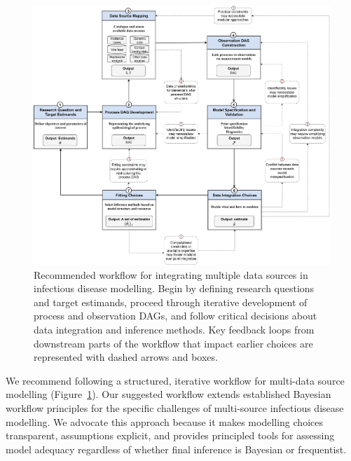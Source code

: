 \documentclass{article}
\begin{document}
\begin{figure}[htbp]
    \centering
    \includegraphics[width=\textwidth]{figures/core steps with more details.drawio.png}
    \caption{Recommended workflow for integrating multiple data sources in infectious disease modelling. Begin by defining research questions and target estimands, proceed through iterative development of process and observation DAGs, and follow critical decisions about data integration and inference methods. Key feedback loops from downstream parts of the workflow that impact earlier choices are represented with dashed arrows and boxes.}
    \label{fig:workflow}
\end{figure}

We recommend following a structured, iterative workflow for multi-data source modelling (Figure~\ref{fig:workflow}). Our suggested workflow extends established Bayesian workflow principles \citep{gelman2020bayesian} for  the specific challenges of multi-source infectious disease modelling.
We advocate this approach because it makes modelling choices transparent, assumptions explicit, and provides principled tools for assessing model adequacy regardless of whether final inference is Bayesian or frequentist.
\end{document}
